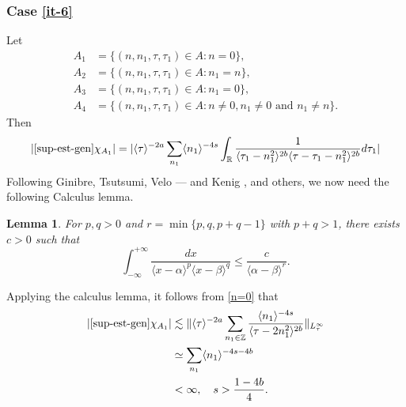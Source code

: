 \documentclass[12pt,reqno]{amsart}
\numberwithin{equation}{section}  %
\numberwithin{figure}{section}
\newcommand{\rr}{\mathbb{R}}
\newcommand{\zz}{\mathbb{Z}}
\theoremstyle{plain}
\newtheorem{lemma}{Lemma}
\theoremstyle{definition}
\theoremstyle{remark}
\newtheorem{remark}{Remark}
\begin{document}
 \subsubsection{Case \eqref{it-6}} 
\label{sssec:case-it-6}
Let 
%
%
\begin{align*}
A_1&=\{(n, n_1, \tau, \tau_1)\in A: n=0\},\\
A_2&=\{(n, n_1, \tau, \tau_1)\in A: n_1 = n \},\\
A_3&=\{(n, n_1, \tau, \tau_1)\in A: n_1=0 \},\\
A_4&=\{(n, n_1, \tau, \tau_1)\in A: n \neq 0, n_1 \neq 0 \text{ and } n_1 \neq n \}.
\end{align*} 
%
%
Then 
%
%
\begin{equation}
  \label{n=0}
\begin{split}
  |  \eqref{sup-est-gen} \chi_{A_{1}}| = | \langle \tau \rangle ^{-2a} \sum_{n_{1}} \langle
  n_{1}\rangle ^{-4s} \int_{\rr} \frac{1}{\langle \tau_{1} - n_{1}^{2} \rangle ^{2b}\langle
  \tau - \tau_{1} - n_{1}^{2}\rangle ^{2b}}d \tau_{1} |
\end{split}
\end{equation}
%
%
Following Ginibre, Tsutsumi, Velo --- and Kenig \cite{Kenig:1996aa}, and others,
we now need the following Calculus lemma.
%
%
%
%
%
%
%
%
\begin{lemma}
	\label{lem:calc}
 For $p, q>0$ and $r=\min\{ p, q, p+q-1\}$ with $p+q>1$, there exists $c>0$ such that
\begin{equation*}
\int_{-\infty}^{+\infty}\frac{dx} {\langle x-\alpha\rangle^{p}\langle x-\beta\rangle^{q}}\leq\dfrac{c} {\langle \alpha-\beta\rangle^{r}}.
\end{equation*}
 \end{lemma}


%
%
%
%
%

Applying the calculus lemma, it follows from \eqref{n=0} that
%
\begin{equation*}
\begin{split}
  |\eqref{sup-est-gen} \chi_{A_{1}} |  & \lesssim \| \langle \tau \rangle ^{-2a} \sum_{n_{1} \in \zz} \frac{\langle n_{1} \rangle
  ^{-4s}}{ \langle \tau - 2n_{1}^{2}  \rangle ^{2b}} \|_{L^{\infty}_{\tau}}
  \\
  & \simeq \sum_{n_{1}} \langle n_{1} \rangle ^{-4s - 4b}
  \\
  & < \infty, \quad s > \frac{1-4b}{4}.
\end{split}
\end{equation*}
%
%
%
%
\end{document}
